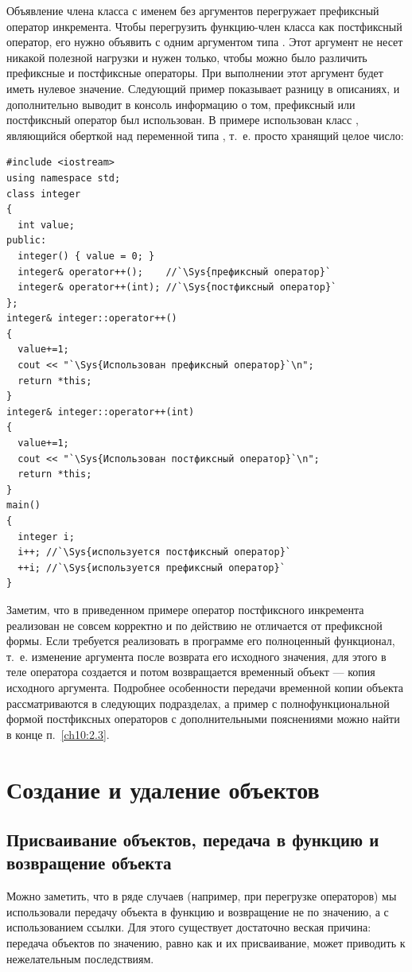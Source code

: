 Объявление члена класса с именем  без аргументов перегружает префиксный оператор
инкремента. Чтобы перегрузить функцию-член класса как постфиксный оператор, его нужно объявить с одним аргументом типа
. Этот аргумент не несет никакой полезной нагрузки и нужен только, чтобы можно было различить
префиксные и постфиксные операторы. При выполнении этот аргумент будет иметь нулевое значение. Следующий пример
показывает разницу в описаниях, и дополнительно выводит в консоль информацию о том, префиксный или постфиксный оператор
был использован. В примере использован класс , являющийся оберткой над переменной типа
, т.~е. просто хранящий целое число:
\begin{lstlisting}
#include <iostream>
using namespace std;
class integer 
{
  int value;
public:
  integer() { value = 0; }
  integer& operator++();    //`\Sys{префиксный оператор}`
  integer& operator++(int); //`\Sys{постфиксный оператор}`
};
integer& integer::operator++() 
{
  value+=1;
  cout << "`\Sys{Использован префиксный оператор}`\n";
  return *this;
} 
integer& integer::operator++(int) 
{
  value+=1;
  cout << "`\Sys{Использован постфиксный оператор}`\n";
  return *this;
} 
main() 
{
  integer i;
  i++; //`\Sys{используется постфиксный оператор}`
  ++i; //`\Sys{используется префиксный оператор}` 
}
\end{lstlisting}

Заметим, что в приведенном примере оператор постфиксного инкремента реализован не совсем корректно и по действию не
отличается от префиксной формы. Если требуется реализовать в программе его полноценный функционал, т.~е. изменение
аргумента после возврата его исходного значения, для этого в теле оператора создается и потом возвращается временный
объект --- копия исходного аргумента. Подробнее особенности передачи временной копии объекта рассматриваются в следующих
подразделах, а пример с полнофункциональной формой постфиксных операторов с дополнительными пояснениями можно найти в
конце п.~\ref{ch10:2.3}.

\section[Создание и удаление объектов]{Создание и удаление объектов}
\subsection[Присваивание объектов, передача в функцию и возвращение объекта]{Присваивание объектов, передача в
функцию и возвращение объекта}
Можно заметить, что в ряде случаев (например, при перегрузке операторов) мы использовали передачу объекта в функцию и
возвращение не по значению, а с использованием ссылки. Для этого существует достаточно веская причина: передача
объектов по значению, равно как и их присваивание, может приводить к нежелательным последствиям.

